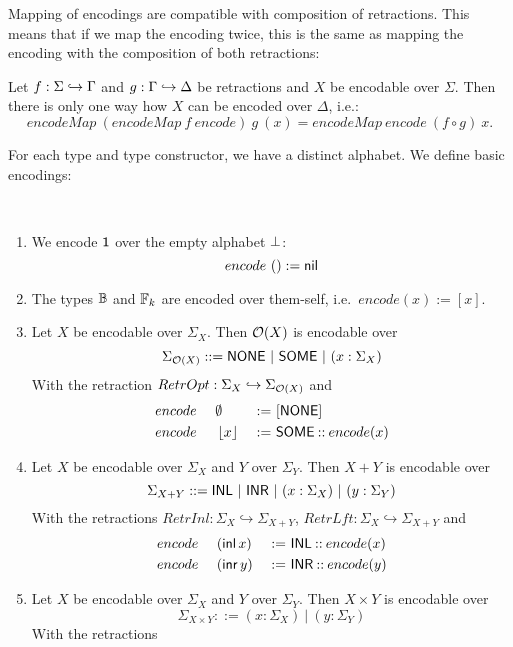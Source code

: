 Mapping of encodings are compatible with composition of retractions.  This means that if we map the encoding twice, this is the same as mapping the
encoding with the composition of both retractions:
\begin{lemma}
  \label{lem:Encode_map_comp}
  Let $f : \Sigma \hookrightarrow \Gamma$ and $g : \Gamma \hookrightarrow \Delta$ be retractions and $X$ be encodable over $\Sigma$.  Then there is only
  one way how $X$ can be encoded over $\Delta$, i.e.:
  \[ encodeMap~(encodeMap~f~encode)~g~(x) = encodeMap~encode~(f \circ g)~x. \]
\end{lemma}

For each type and type constructor, we have a distinct alphabet.  We define basic encodings:
\begin{definition}
  \label{def:basic-encodings}
  ~
  \begin{enumerate}
  \item We encode $\mathsf{1}$ over the empty alphabet $\bot$:
  \[ encode~\mathsf{()} := \mathsf{nil}
  \]
  \item The types $\mathbb{B}$ and $\mathbb{F}_k$ are encoded over them-self, i.e.\ $encode(x):=[x]$.
  \item Let $X$ be encodable over $\Sigma_X$.  Then $\mathcal{O}(X)$ is encodable over
    \[ \Sigma_{\mathcal{O}(X)} ::= \mathsf{NONE} ~|~ \mathsf{SOME} ~|~ (x:\Sigma_X) \]
    With the retraction $RetrOpt : \Sigma_X \hookrightarrow \Sigma_{\mathcal{O}(X)}$ and
    \begin{alignat*}{3}
      &encode~&&\emptyset  &~:=~& [\mathsf{NONE}] \\
      &encode~&&\left\lfloor {x} \right\rfloor&~:=~& \mathsf{SOME} \mathbin{::} encode(x)
    \end{alignat*}
  \item Let $X$ be encodable over $\Sigma_X$ and $Y$ over $\Sigma_Y$.  Then $X+Y$ is encodable over
    \[ \Sigma_{X+Y} ::= \mathsf{INL} ~|~ \mathsf{INR} ~|~ (x:\Sigma_X) ~|~ (y:\Sigma_Y) \] With the retractions
    $RetrInl : \Sigma_X \hookrightarrow \Sigma_{X+Y}$, $RetrLft : \Sigma_X \hookrightarrow \Sigma_{X+Y}$ and
    \begin{alignat*}{3}
      &encode~&&(\operatorname{\mathsf{inl}} x)&~:=~& \mathsf{INL} \mathbin{::} encode(x) \\
      &encode~&&(\operatorname{\mathsf{inr}} y)&~:=~& \mathsf{INR} \mathbin{::} encode(y)
    \end{alignat*}
  \item Let $X$ be encodable over $\Sigma_X$ and $Y$ over $\Sigma_Y$.  Then $X \times Y$ is encodable over
    \[ \Sigma_{X \times Y} ::= (x:\Sigma_X) ~|~ (y:\Sigma_Y) \] With the retractions

\end{enumerate}
\end{definition}
